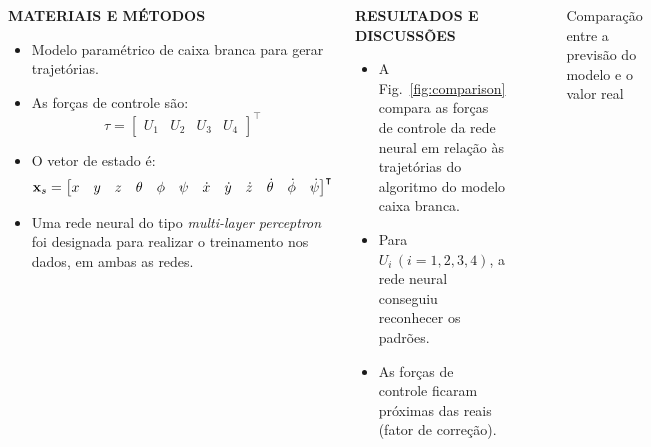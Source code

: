 \documentclass[serif,20pt]{beamer}
\begin{document}
\begin{frame}[t]
\begin{columns}[t]
\begin{block}{\centering\bfseries MATERIAIS E MÉTODOS}
\begin{itemize}\justifying
    \item Modelo paramétrico de caixa branca para gerar trajetórias.\cite{geronel2023}
    \item As forças de controle são:
    \begin{equation}
        \tau = \begin{bmatrix}
            U_1 & U_2 & U_3 & U_4
        \end{bmatrix}^{\intercal}
    \end{equation}
    \item O vetor de estado é:
    \begin{equation}
        \setcounter{MaxMatrixCols}{20}
        \mathbf{x}_s = \begin{bmatrix}
            x & y & z & \theta & \phi & \psi & \dot{x} & \dot{y} & \dot{z} & \dot{\theta} & \dot{\phi} & \dot{\psi}
        \end{bmatrix}^{\intercal}
    \end{equation}
    \item Uma rede neural do tipo \emph{multi-layer perceptron} foi designada para realizar o treinamento nos dados, em ambas as redes.
\end{itemize}
\vspace{1cm}
\end{block}

\begin{block}{\centering\bfseries RESULTADOS E DISCUSSÕES}
\vspace{1cm}
\begin{itemize}\justifying
    \item A Fig.~\ref{fig:comparison} compara as forças de controle da rede neural em relação às trajetórias do algoritmo do modelo caixa branca.
\end{itemize}
\begin{itemize}
    \item Para \(U_i\, (i=1,2,3,4)\), a rede neural conseguiu reconhecer os padrões.
    \item As forças de controle ficaram próximas das reais (fator de correção).
\end{itemize}
\end{block}



\begin{block}{}

\begin{figure}[H]
    \centering
    \caption{Comparação entre a previsão do modelo e o valor real}


\end{figure}
\end{block}
\end{columns}
\end{frame}
\end{document}
